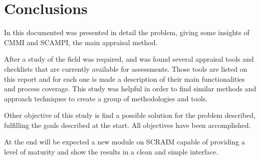 \chapter{Conclusions} \label{chap:concl} 

In this documented was presented in detail the problem, giving some insights of CMMI and SCAMPI, the main appraisal method.

After a study of the field was required, and was found several appraisal tools and checklists that are currently available for assessments. Those tools are listed on this report and for each one is made a description of their main functionalities and process coverage. This study was helpful in order to find similar methods and approach techniques to create a group of methodologies and tools.

Other objective of this study is find a possible solution for the problem described, fulfilling the goals described at the start. All objectives have been accomplished.

At the end will be expected a new module on SCRAIM capable of providing a level of maturity and show the results in a clean and simple interface.